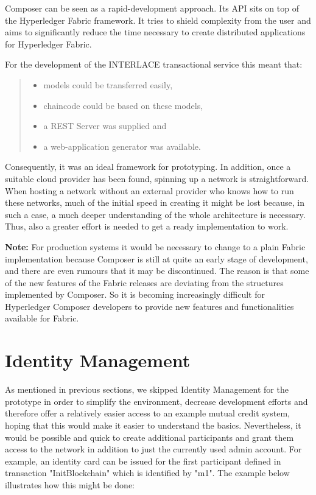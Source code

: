 Composer can be seen as a rapid-development approach. Its API sits on top of the Hyperledger Fabric framework. It tries to shield complexity from the user and aims to significantly reduce the time necessary to create distributed applications for Hyperledger Fabric.

For the development of the INTERLACE transactional service this meant that:
\begin{quote}
\begin{itemize}
	\item models could be transferred easily,
	\item chaincode could be based on these models,
	\item a REST Server was supplied and
	\item a web-application generator was available.
\end{itemize}
\end{quote}

Consequently, it was an ideal framework for prototyping. In addition, once a suitable cloud provider has been found, spinning up a network is straightforward. When hosting a network without an external provider who knows how to run these networks, much of the initial speed in creating it might be lost because, in such a case, a much deeper understanding of the whole architecture is necessary. Thus, also a greater effort is needed to get a ready implementation to work.

\textbf{Note:} For production systems it would be necessary to change to a plain Fabric implementation because Composer is still at quite an early stage of development, and there are even rumours that it may be discontinued. The reason is that some of the new features of the Fabric releases are deviating from the structures implemented by Composer. So it is becoming increasingly difficult for Hyperledger Composer developers to provide new features and functionalities available for Fabric.

\section{Identity Management}
\label{sec:id-management}

As mentioned in previous sections, we skipped Identity Management for the prototype in order to simplify the environment, decrease development efforts and therefore offer a relatively easier access to an example mutual credit system, hoping that this would make it easier to understand the basics. Nevertheless, it would be possible and quick to create additional participants and grant them access to the network in addition to just the currently used admin account. For example, an identity card can be issued for the first participant defined in transaction "InitBlockchain" which is identified by "m1". The example below illustrates how this might be done:

